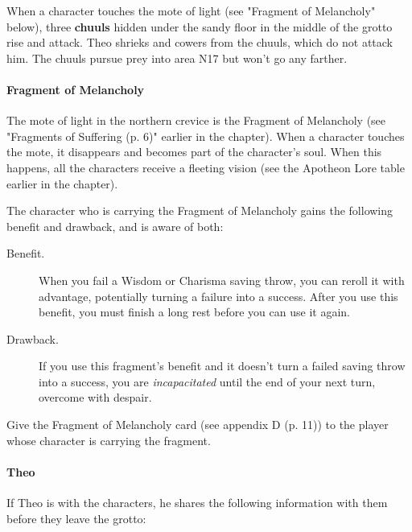 \documentclass[letterpaper, 11pt, bg=full, twocolumn]{dndbook}
\begin{document}
When a character touches the mote of light (see "Fragment of Melancholy" below), three \textbf{chuuls} hidden under the sandy floor in the middle of the grotto rise and attack. Theo shrieks and cowers from the chuuls, which do not attack him. The chuuls pursue prey into area N17 but won't go any farther.

\paragraph{Fragment of Melancholy}

The mote of light in the northern crevice is the Fragment of Melancholy (see "Fragments of Suffering (p. 6)" earlier in the chapter). When a character touches the mote, it disappears and becomes part of the character's soul. When this happens, all the characters receive a fleeting vision (see the Apotheon Lore table earlier in the chapter).

The character who is carrying the Fragment of Melancholy gains the following benefit and drawback, and is aware of both:

\begin{DndSidebar}{}
\begin{description}
\item[Benefit.] When you fail a Wisdom or Charisma saving throw, you can reroll it with advantage, potentially turning a failure into a success. After you use this benefit, you must finish a long rest before you can use it again.
\item[Drawback.] If you use this fragment's benefit and it doesn't turn a failed saving throw into a success, you are \textit{incapacitated} until the end of your next turn, overcome with despair.
\end{description}
\end{DndSidebar}

Give the Fragment of Melancholy card (see appendix D (p. 11)) to the player whose character is carrying the fragment.

\paragraph{Theo}

If Theo is with the characters, he shares the following information with them before they leave the grotto:
\end{document}
